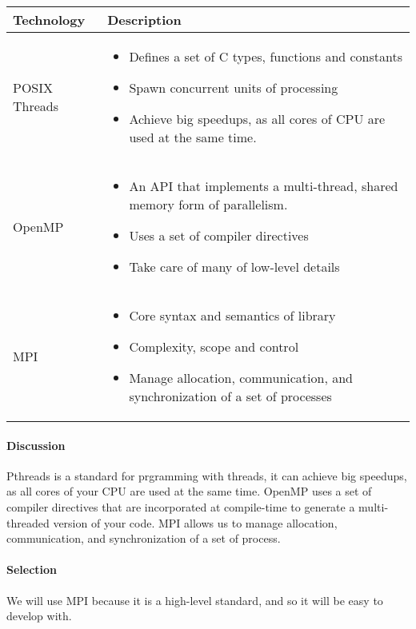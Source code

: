 \begin{center}
  \begin{tabular}{ | l | p{10cm} | }
    \hline
    Technology & Description  \\ \hline
    POSIX Threads \cite{posix-threads} &
    \begin{itemize}
      \item Defines a set of C types, functions and constants 
      \item Spawn concurrent units of processing
      \item Achieve big speedups, as all cores of CPU are used at the same time.
      \end{itemize}\\ \hline
    OpenMP \cite{Openmp} &
    \begin{itemize}
      \item An API that implements a multi-thread, shared memory form of parallelism.
      \item Uses a set of compiler directives 
      \item Take care of many of low-level details
    \end{itemize}\\ \hline
    MPI \cite{mpi} &
    \begin{itemize}
      \item Core syntax and semantics of library
      \item Complexity, scope and control
      \item Manage allocation, communication, and synchronization of a set of processes 
    \end{itemize}\\ \hline
  \end{tabular}

\end{center}

\paragraph{Discussion}

Pthreads is a standard for prgramming with threads, it can achieve big speedups, as all cores of your CPU are used at the same time.
OpenMP uses a set of compiler directives that are incorporated at compile-time to generate a multi-threaded version of your code.
MPI allows us to manage allocation, communication, and synchronization of a set of process.

\paragraph{Selection}

We will use MPI because it is a high-level standard, and so it will be easy to develop with.
